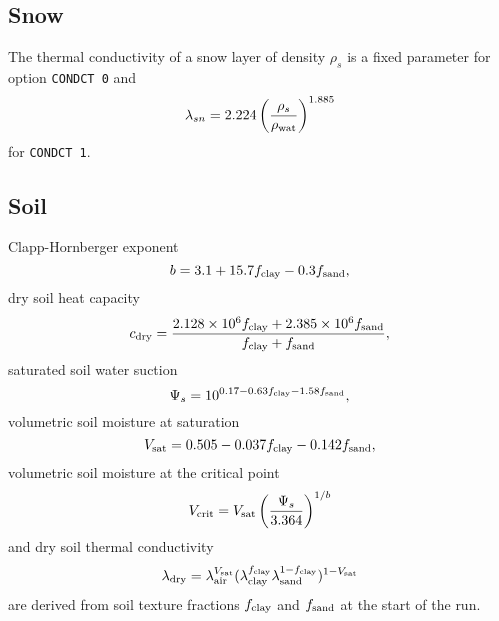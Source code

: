\documentclass[fleqn]{article}
\begin{document}
\subsection{Snow}
The thermal conductivity of a snow layer of density $\rho_s$ is a fixed parameter for option {\tt CONDCT 0} and 
\begin{equation}
\lambda_{sn} = 2.224\left(\frac{\rho_s}{\rho_{\rm wat}}\right)^{1.885}
\end{equation}
for {\tt CONDCT 1}. 

\subsection{Soil}
Clapp-Hornberger exponent
\begin{equation}
b = 3.1 + 15.7f_{\rm clay} - 0.3f_{\rm sand},
\end{equation}
dry soil heat capacity
\begin{equation}
c_{\rm dry} = \frac{2.128\times10^6f_{\rm clay} + 2.385\times10^6f_{\rm sand}}{f_{\rm clay} + f_{\rm sand}},
\end{equation}
saturated soil water suction
\begin{equation}
\Psi_s = 10^{0.17 - 0.63f_{\rm clay} - 1.58f_{\rm sand}},
\end{equation}
volumetric soil moisture at saturation
\begin{equation}
V_{\rm sat} = 0.505 - 0.037f_{\rm clay} - 0.142f_{\rm sand},
\end{equation}
volumetric soil moisture at the critical point
\begin{equation}
V_{\rm crit} = V_{\rm sat}\left(\frac{\Psi_s}{3.364}\right)^{1/b}
\end{equation}
and dry soil thermal conductivity
\begin{equation}
\lambda_{\rm dry} = \lambda_{\rm air}^{V_{\rm sat}}(\lambda_{\rm clay}^{f_{\rm clay}}\lambda_{\rm sand}^{1 - f_{\rm clay}})^{1 - V_{\rm sat}}
\end{equation}
are derived from soil texture fractions $f_{\rm clay}$ and $f_{\rm sand}$ at the start of the run.
\end{document}
